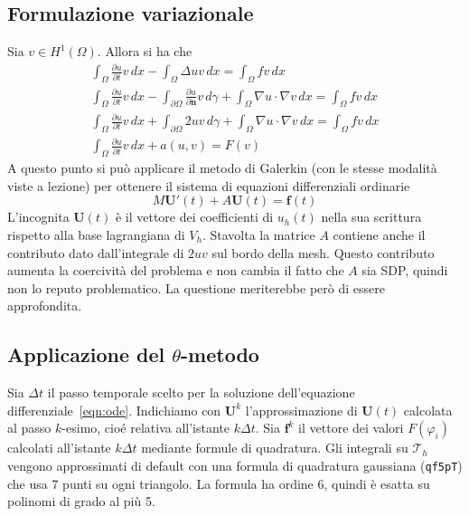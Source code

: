 \documentclass[a4paper]{article}
\renewcommand{\vec}[1]{\mathbf{#1}}
\newcommand{\dx}{\, dx}
\newcommand{\dgamma}{\, d\gamma}
\begin{document}
\subsection{Formulazione variazionale}
Sia $v \in H^1(\Omega)$. Allora si ha che
\begin{gather*}
  \int_\Omega{\frac{\partial u}{\partial t} v \dx}
- \int_\Omega{\Delta u v \dx}
= \int_\Omega{f v \dx} \\
  \int_\Omega{\frac{\partial u}{\partial t} v \dx}
- \int_{\partial\Omega}{\frac{\partial u}{\partial \mathbf{n}} v \dgamma}
+ \int_\Omega{\nabla u \cdot \nabla v \dx}
= \int_\Omega{f v \dx} \\
  \int_\Omega{\frac{\partial u}{\partial t} v \dx}
+ \int_{\partial\Omega}{2 u v \dgamma}
+ \int_\Omega{\nabla u \cdot \nabla v \dx}
= \int_\Omega{f v \dx} \\
  \int_\Omega{\frac{\partial u}{\partial t} v \dx}
+ a(u,v)
= F(v)
\end{gather*}
A questo punto si può applicare il metodo di Galerkin (con le stesse modalità
viste a lezione) per ottenere il sistema di equazioni differenziali ordinarie
\begin{equation} \label{eqn:ode}
M \vec{U}'(t) + A \vec{U}(t) = \vec{f}(t)
\end{equation}
L'incognita $\vec{U}(t)$ è il vettore dei coefficienti di $u_h(t)$
nella sua scrittura rispetto alla base lagrangiana di $V_h$.
Stavolta la matrice $A$ contiene anche il contributo dato dall'integrale
di $2 u v$ sul bordo della mesh. Questo contributo aumenta la coercività del problema
e non cambia il fatto che $A$ sia SDP, quindi non lo reputo problematico.
La questione meriterebbe però di essere approfondita.

\subsection{Applicazione del \texorpdfstring{$\theta$}{theta}-metodo}
Sia $\Delta t$ il passo temporale scelto per la soluzione dell'equazione
differenziale~\eqref{eqn:ode}. Indichiamo con $\vec{U}^k$ l'approssimazione
di $\vec{U}(t)$ calcolata al passo $k$-esimo, cioé relativa all'istante $k \Delta t$.
Sia $\vec{f}^k$ il vettore dei valori $F(\varphi_i)$ calcolati
all'istante $k \Delta t$ mediante formule di quadratura.
Gli integrali su $\mathcal{T}_h$ vengono approssimati di default con una formula
di quadratura gaussiana (\texttt{qf5pT}) che usa 7 punti su ogni triangolo.
La formula ha ordine 6, quindi è esatta su polinomi di grado al più 5.
\end{document}
